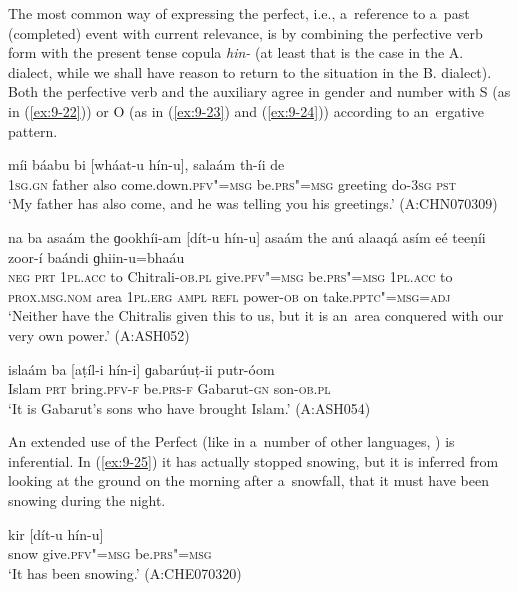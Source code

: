 The most common way of expressing the perfect, i.e., a~reference to a~past (completed) event with current relevance, is by combining the perfective verb form with the present tense copula \textit{hin-} (at least that is the case in the A. dialect, while we shall have reason to return to the situation in the B. dialect). Both the perfective verb and the auxiliary agree in gender and number with S (as in (\ref{ex:9-22})) or O (as in (\ref{ex:9-23}) and (\ref{ex:9-24})) according to an~ergative pattern.

\begin{exe}
\ex
\label{ex:9-22}
\gll míi báabu bi [wháat-u hín-u], salaám th-íi de \\
\textsc{1sg.gn} father also come.down.\textsc{pfv"=msg} be.\textsc{prs"=msg} greeting do-\textsc{3sg} \textsc{pst} \\
\glt `My father has also come, and he was telling you his greetings.' (A:CHN070309)

\ex
\label{ex:9-23}
\gll na ba asaám the ɡookhíi-am [dít-u hín-u] asaám the anú alaaqá asím eé teeṇíi zoor-í baándi ɡhiin-u=bhaáu \\
\textsc{neg} \textsc{prt} \textsc{1pl.acc} to Chitrali-\textsc{ob.pl} give.\textsc{pfv"=msg}  be.\textsc{prs"=msg } \textsc{1pl.acc} to \textsc{prox.msg.nom} area  \textsc{1pl.erg} \textsc{ampl} \textsc{refl} power-\textsc{ob} on take.\textsc{pptc"=msg=adj} \\
\glt `Neither have the Chitralis given this to us, but it is an~area conquered with our very own power.' (A:ASH052)

\ex
\label{ex:9-24}
\gll islaám ba [aṭíl-i hín-i] ɡabarúuṭ-ii putr-óom \\
Islam \textsc{prt} bring.\textsc{pfv-f} be.\textsc{prs-f} Gabarut-\textsc{gn} son-\textsc{ob.pl} \\
\glt `It is Gabarut's sons who have brought Islam.' (A:ASH054) 
\end{exe}

An extended use of the Perfect (like in a~number of other languages, \citealt[152]{dahl1985}) is inferential. In (\ref{ex:9-25}) it has actually stopped snowing, but it is inferred from looking at the ground on the morning after a~snowfall, that it must have been snowing during the night.

\begin{exe}
\ex
\label{ex:9-25}
\gll kir [dít-u hín-u] \\
snow give.\textsc{pfv"=msg} be.\textsc{prs"=msg} \\
\glt `It has been snowing.' (A:CHE070320)
\end{exe}

